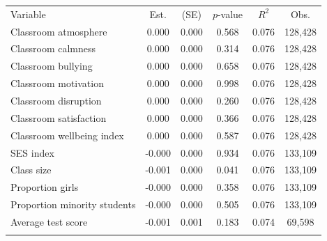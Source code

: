 \begin{center}
\begin{tabular}{lccccc}
\hline \noalign{\smallskip}Variable & Est. & (SE) &  $ p$-value &  $ R^2$ & Obs.\\
\noalign{\smallskip}\hline \noalign{\smallskip}Classroom atmosphere & 0.000 & 0.000 & 0.568 & 0.076 & 128,428\\
Classroom calmness & 0.000 & 0.000 & 0.314 & 0.076 & 128,428\\
Classroom bullying & 0.000 & 0.000 & 0.658 & 0.076 & 128,428\\
Classroom motivation & 0.000 & 0.000 & 0.998 & 0.076 & 128,428\\
Classroom disruption & 0.000 & 0.000 & 0.260 & 0.076 & 128,428\\
Classroom satisfaction & 0.000 & 0.000 & 0.366 & 0.076 & 128,428\\
Classroom wellbeing index & 0.000 & 0.000 & 0.587 & 0.076 & 128,428\\
SES index & -0.000 & 0.000 & 0.934 & 0.076 & 133,109\\
Class size & -0.001 & 0.000 & 0.041 & 0.076 & 133,109\\
Proportion girls & -0.000 & 0.000 & 0.358 & 0.076 & 133,109\\
Proportion minority students & -0.000 & 0.000 & 0.505 & 0.076 & 133,109\\
Average test score & -0.001 & 0.001 & 0.183 & 0.074 & 69,598\\
\noalign{\smallskip}\hline\end{tabular}\\
\end{center}
